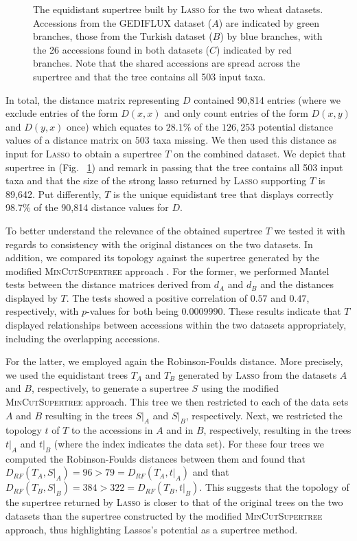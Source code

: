 \begin{figure}
  \centering {}
  \caption{The equidistant supertree built by \textsc{Lasso} for the two wheat
    datasets. Accessions from the GEDIFLUX dataset ($A$) are indicated by
    green branches, those from the Turkish dataset ($B$) by blue branches,
    with the 26 accessions found in both datasets ($C$) indicated by red
    branches. Note that the shared accessions are spread across the supertree
    and that the tree contains all 503 input taxa.}
  \label{fig:wheat-supertree}
\end{figure}

In total, the distance matrix representing $D$ contained 90,814 entries (where
we exclude entries of the form $D(x,x)$ and only count entries of the form
$D(x,y)$ and $D(y,x)$ once) which equates to $28.1\%$ of the $126,253$
potential distance values of a distance matrix on $503$ taxa missing.  We then
used this distance as input for \textsc{Lasso} to obtain a supertree $T$ on
the combined dataset. We depict that supertree in (Fig.~
\ref{fig:wheat-supertree}) and remark in passing that the tree contains all
503 input taxa and that the size of the strong lasso returned by
\textsc{Lasso} supporting $T$ is 89,642. Put differently, $T$ is the unique
equidistant tree that displays correctly 98.7\% of the 90,814 distance values
for $D$.

To better understand the relevance of the obtained supertree $T$ we tested it
with regards to consistency with the original distances on the two
datasets. In addition, we compared its topology against the supertree
generated by the modified \textsc{MinCutSupertree} approach
\cite{page02mincut}.  For the former, we performed Mantel tests between the
distance matrices derived from $d_A$ and $d_B$ and the distances displayed by
$T$.  The tests showed a positive correlation of $0.57$ and $0.47$,
respectively, with $p$-values for both being $0.0009990$. These results
indicate that $T$ displayed relationships between accessions within the two
datasets appropriately, including the overlapping accessions.

For the latter, we employed again the Robinson-Foulds distance. More
precisely, we used the equidistant trees $T_A$ and $T_B$ generated by
\textsc{Lasso} from the datasets $A$ and $B$, respectively, to generate a
supertree $S$ using the modified \textsc{MinCutSupertree} approach. This tree
we then restricted to each of the data sets $A$ and $B$ resulting in the trees
$S|_A$ and $S|_B$, respectively. Next, we restricted the topology $t$ of $T$
to the accessions in $A$ and in $B$, respectively, resulting in the trees
$t|_A$ and $t|_B$ (where the index indicates the data set). For these four
trees we computed the Robinson-Foulds distances between them and found that
$D_{RF}(T_A,S|_A)= 96>79= D_{RF}(T_A,t|_A)$ and that $D_{RF}(T_B,S|_B)=
384>322=D_{RF}(T_B,t|_B)$.  This suggests that the topology of the supertree
returned by \textsc{Lasso} is closer to that of the original trees on the two
datasets than the supertree constructed by the modified
\textsc{MinCutSupertree} approach, thus highlighting {\sc Lassos}'s potential
as a supertree method.

